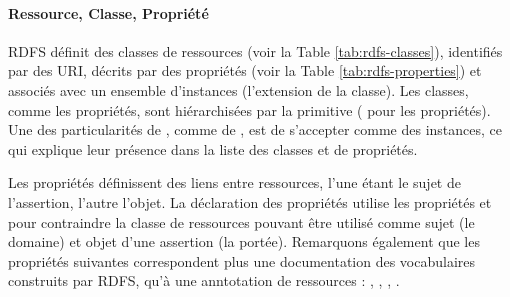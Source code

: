 \paragraph{Ressource, Classe, Propriété}
RDFS définit des classes de ressources (voir la Table \ref{tab:rdfs-classes}), identifiés par des URI, décrits par des propriétés (voir la Table \ref{tab:rdfs-properties}) et associés avec un ensemble d'instances (l'extension de la classe). 
Les classes, comme les propriétés, sont hiérarchisées par la primitive  ( pour les propriétés).
Une des particularités de , comme de , est de s'accepter comme des instances, ce qui explique leur présence dans la liste des classes et de propriétés.

Les propriétés définissent des liens entre ressources, l'une étant le sujet de l'assertion, l'autre l'objet.
La déclaration des propriétés utilise les propriétés  et  pour contraindre la classe de ressources pouvant être utilisé comme sujet (le domaine) et objet d'une assertion (la portée).
Remarquons également que les propriétés suivantes correspondent plus une documentation des vocabulaires construits par RDFS, qu'à une anntotation de ressources : , , , .



